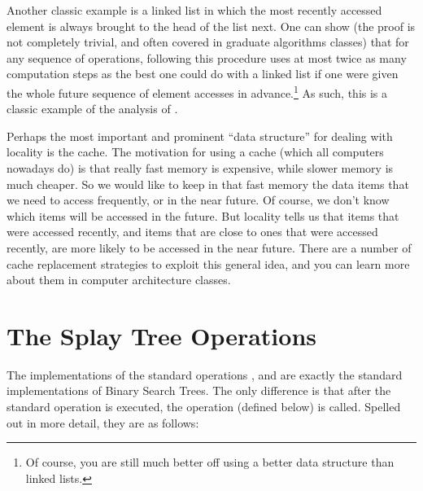 Another classic example is a linked list in which the most recently
accessed element is always brought to the head of the list next. 
One can show (the proof is not completely trivial, and often covered
in graduate algorithms classes) that for any sequence of operations,
following this procedure uses at most twice as many computation steps
as the best one could do with a linked list if one were given the whole
future sequence of element accesses in advance.\footnote{Of course,
  you are still much better off using a better  data
  structure than linked lists.} As such, this is a
classic example of the analysis of . 

Perhaps the most important and prominent ``data structure'' for
dealing with locality is the cache. The motivation for using a cache
(which all computers nowadays do) is that really fast memory is
expensive, while slower memory is much cheaper. So we would like to
keep in that fast memory the data items that we need to access
frequently, or in the near future. Of course, we don't know which
items will be accessed in the future. But locality tells us that items
that were accessed recently, and items that are close to ones that
were accessed recently, are more likely to be accessed in the near
future. There are a number of cache replacement strategies to exploit
this general idea, and you can learn more about them in computer
architecture classes.

\section{The Splay Tree Operations}

The implementations of the standard operations ,
 and  are exactly the standard implementations
of Binary Search Trees. The only difference is that after the standard
operation is executed, the  operation (defined below) is
called. Spelled out in more detail, they are as follows:

